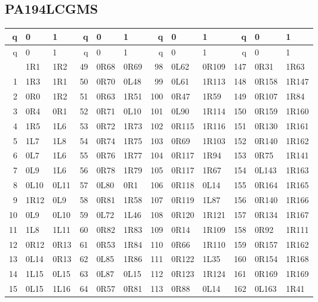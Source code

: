 \subsection{PA194LCGMS}
\begingroup\footnotesize\ttfamily\setlength{\tabcolsep}{4pt}\renewcommand{\arraystretch}{0.94}
\begin{longtable}{rll@{\hspace{1.3em}}rll@{\hspace{1.3em}}rll@{\hspace{1.3em}}rll}
\toprule q & 0 & 1 & q & 0 & 1 & q & 0 & 1 & q & 0 & 1\\\midrule\endfirsthead
\toprule q & 0 & 1 & q & 0 & 1 & q & 0 & 1 & q & 0 & 1\\\midrule\endhead
\bottomrule\endfoot
0 & 1R1 & 1R2 & 49 & 0R68 & 0R69 & 98 & 0L62 & 0R109 & 147 & 0R31 & 1R63\\
1 & 1R3 & 1R1 & 50 & 0R70 & 0L48 & 99 & 0L61 & 1R113 & 148 & 0R158 & 1R147\\
2 & 0R0 & 1R2 & 51 & 0R63 & 1R51 & 100 & 0R47 & 1R59 & 149 & 0R107 & 1R84\\
3 & 0R4 & 0R1 & 52 & 0R71 & 0L10 & 101 & 0L90 & 1R114 & 150 & 0R159 & 1R160\\
4 & 1R5 & 1L6 & 53 & 0R72 & 1R73 & 102 & 0R115 & 1R116 & 151 & 0R130 & 1R161\\
5 & 1L7 & 1L8 & 54 & 0R74 & 1R75 & 103 & 0R69 & 1R103 & 152 & 0R140 & 1R162\\
6 & 0L7 & 1L6 & 55 & 0R76 & 1R77 & 104 & 0R117 & 1R94 & 153 & 0R75 & 1R141\\
7 & 0L9 & 1L6 & 56 & 0R78 & 1R79 & 105 & 0R117 & 1R67 & 154 & 0L143 & 1R163\\
8 & 0L10 & 0L11 & 57 & 0L80 & 0R1 & 106 & 0R118 & 0L14 & 155 & 0R164 & 1R165\\
9 & 1R12 & 0L9 & 58 & 0R81 & 1R58 & 107 & 0R119 & 1L87 & 156 & 0R140 & 1R166\\
10 & 0L9 & 0L10 & 59 & 0L72 & 1L46 & 108 & 0R120 & 1R121 & 157 & 0R134 & 1R167\\
11 & 1L8 & 1L11 & 60 & 0R82 & 1R83 & 109 & 0R14 & 1R109 & 158 & 0R92 & 1R111\\
12 & 0R12 & 0R13 & 61 & 0R53 & 1R84 & 110 & 0R66 & 1R110 & 159 & 0R157 & 1R162\\
13 & 0L14 & 0R13 & 62 & 0L85 & 1R86 & 111 & 0R122 & 1L35 & 160 & 0R154 & 1R168\\
14 & 1L15 & 0L15 & 63 & 0L87 & 0L15 & 112 & 0R123 & 1R124 & 161 & 0R169 & 1R169\\
15 & 0L15 & 1L16 & 64 & 0R57 & 0R81 & 113 & 0R88 & 0L14 & 162 & 0L163 & 1R41\\

\end{longtable}
